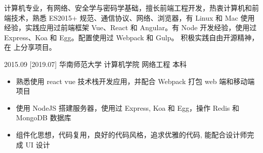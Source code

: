 \documentclass[zh]{resume}
\begin{document}
\makeheader

{\onehalfspacing\hspace{2em}%
计算机专业，有网络、安全学与密码学基础，擅长前端工程开发，热衷计算机和前端技术，熟悉 ES2015+ 规范、通信协议、网络、浏览器，有 Linux 和 Mac 使用经验，实践应用过前端框架 Vue、React 和 Angular。有 Node 开发经验，使用过 Express、Koa 和 Egg。配置使用过 Webpack 和 Gulp。
积极实践自由开源精神，在  上分享项目。
\par}


\begin{educations}
  \education%
    {2015.09}%
    [2019.07]%
    {华南师范大学}%
    {计算机学院}%
    {网络工程}%
    {本科}
\end{educations}

\begin{itemize}
  \item 熟悉使用 react vue 技术栈开发应用，并配合 Webpack 打包 web 端和移动端项目
  \item 使用 NodeJS 搭建服务器，使用过 Express, Koa 和 Egg，操作 Redis 和 MongoDB 数据库
  \item 组件化思想，代码复用，良好的代码风格，追求优雅的代码, 能配合设计师完成 UI 设计
\end{itemize}
\end{document}
